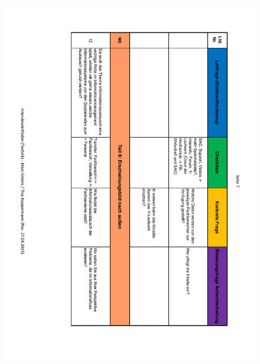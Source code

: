\begin{figure}
	\centering
	\includegraphics[width=18cm]{kapitel/anhang/Interviewleitfaden_7}
\end{figure}

